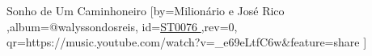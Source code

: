 \beginsong
{Sonho de Um Caminhoneiro %
}[by={Milionário e José Rico %
},album={@walyssondosreis},
id={\href{https://music.youtube.com/watch?v=_e69eLtfC6w&feature=share %
}{ST0076 %
}},rev={0}, %
qr={https://music.youtube.com/watch?v=_e69eLtfC6w&feature=share %
}]
\beginverse
